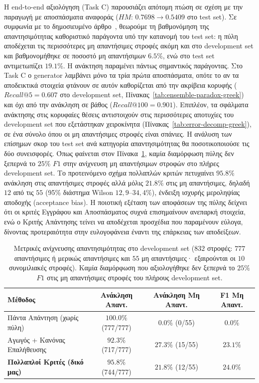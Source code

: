 Η end-to-end αξιολόγηση (Task C) παρουσιάζει απότομη πτώση σε σχέση με την παραγωγή με αποσπάσματα αναφοράς ($HM$: $0.7698 \rightarrow 0.5409$ στο test set). Σε συμφωνία με το δημοσιευμένο άρθρο~\citep{athanasiou2026ailsntua}, θεωρούμε τη βαθμονόμηση της απαντησιμότητας καθοριστικό παράγοντα υπό την κατανομή του test set: η πύλη αποδέχεται τις περισσότερες μη απαντήσιμες στροφές ακόμη και στο development set και βαθμονομήθηκε σε ποσοστό μη απαντήσιμων $6.5\%$, ενώ στο test set αντιμετωπίζει $19.1\%$. Η ανάκτηση παραμένει πάντως σημαντικός παράγοντας. Στο Task C ο generator λαμβάνει μόνο τα τρία πρώτα αποσπάσματα, οπότε το αν τα αποδεικτικά στοιχεία φτάνουν σε αυτόν καθορίζεται από την ακρίβεια κορυφής ($Recall@5{=}0.607$ στο development set, Πίνακας~\ref{tab:ensemble-paradox-greek}) και όχι από την ανάκληση σε βάθος ($Recall@100{=}0.901$). Επιπλέον, τα σφάλματα ανάκτησης στις κορυφαίες θέσεις αντιστοιχούν στις περισσότερες αποτυχίες του development set που εξετάστηκαν χειροκίνητα (Πίνακας~\ref{tab:error-decomp-greek}), σε ένα σύνολο όπου οι μη απαντήσιμες στροφές είναι σπάνιες. Η ανάλυση των επίσημων σκορ του test set ανά κατηγορία απαντησιμότητας θα ποσοτικοποιούσε τις δύο συνεισφορές. Όπως φαίνεται στον Πίνακα~\ref{tab:answerability-greek}, καμία διαμόρφωση πύλης δεν ξεπερνά το $25\%$ $F1$ στην ανίχνευση μη απαντήσιμων στροφών στο πλήρες development set. Το προτεινόμενο σχήμα πολλαπλών κριτών πετυχαίνει $95.8\%$ ανάκληση στις απαντήσιμες στροφές αλλά μόλις $21.8\%$ στις μη απαντήσιμες, δηλαδή $12$ από τις $55$ (95\% διάστημα Wilson $12{,}9$--$34{,}4\%$), ένδειξη ισχυρής μεροληψίας αποδοχής (acceptance bias). Η ποιοτική εξέταση των αποφάσεων της πύλης δείχνει ότι οι κριτές Εγγράφου και Αποσπάσματος συχνά επισημαίνουν ανεπαρκή στοιχεία, ενώ ο Κριτής Απάντησης τείνει να αποδέχεται προσχέδια που παραμένουν εύλογα, δίνοντας προτεραιότητα στην ευλογοφάνεια έναντι της επάρκειας των αποδείξεων.

\begin{table}[ht]
\centering
\small
\begin{tabular}{lccc}
\toprule
\textbf{Μέθοδος} & \textbf{Ανάκληση Απαντ.} & \textbf{Ανάκληση Μη Απαντ.} & \textbf{F1 Μη Απαντ.} \\
\midrule
Πάντα Απάντηση (χωρίς πύλη) & $100.0\%$ (777/777) & $0.0\%$ (0/55) & $0.0\%$ \\
Αγωγός + Κανόνας Επαλήθευσης & $92.3\%$ (717/777) & $27.3\%$ (15/55) & $23.1\%$ \\
\textbf{Πολλαπλοί Κριτές (δικό μας)} & $95.8\%$ (744/777) & $21.8\%$ (12/55) & $24.0\%$ \\
\bottomrule
\end{tabular}
\caption{Μετρικές ανίχνευσης απαντησιμότητας στο development set ($832$ στροφές: $777$ απαντήσιμες ή μερικώς απαντήσιμες και $55$ μη απαντήσιμες· εξαιρούνται οι $10$ συνομιλιακές στροφές). Καμία διαμόρφωση που αξιολογήθηκε δεν ξεπερνά το $25\%$ $F1$ στις μη απαντήσιμες στροφές του πλήρους development set.}
\label{tab:answerability-greek}
\end{table}

